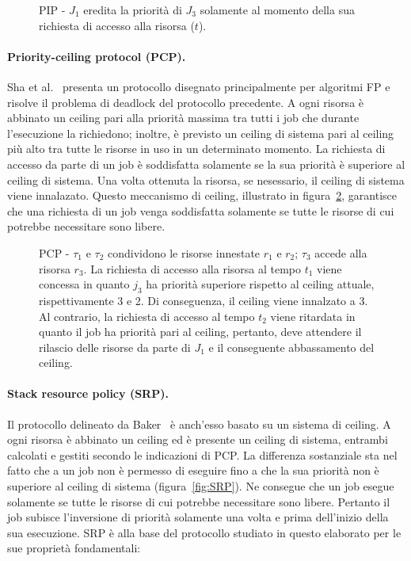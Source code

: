\begin{figure}
\centering
\PIP
\caption{PIP - $J_1$ eredita la priorità di $J_3$ solamente al momento della sua richiesta di accesso alla risorsa ($t$).}
\label{fig:PIP}
\end{figure}

\paragraph{Priority-ceiling protocol (PCP).} Sha et al.~\cite{Sha:1990:PIP:102822.626613} presenta un protocollo disegnato principalmente per algoritmi FP e risolve il problema di deadlock del protocollo precedente. A ogni risorsa è abbinato un ceiling pari alla priorità massima tra tutti i job che durante l'esecuzione la richiedono; inoltre, è previsto un ceiling di sistema pari al ceiling più alto tra tutte le risorse in uso in un determinato momento. La richiesta di accesso da parte di un job è soddisfatta solamente se la sua priorità è superiore al ceiling di sistema. Una volta ottenuta la risorsa, se nesessario, il ceiling di sistema viene innalazato. Questo meccanismo di ceiling, illustrato in figura~\ref{fig:PCP}, garantisce che una richiesta di un job venga soddisfatta solamente se tutte le risorse di cui potrebbe necessitare sono libere.

\begin{figure}
\centering
\PCP
\caption{PCP - $\tau_1$ e $\tau_2$ condividono le risorse innestate $r_1$ e $r_2$; $\tau_3$ accede alla risorsa $r_3$. La richiesta di accesso alla risorsa al tempo $t_1$ viene concessa in quanto $j_3$ ha priorità superiore rispetto al ceiling attuale, rispettivamente 3 e 2. Di conseguenza, il ceiling viene innalzato a 3. Al contrario, la richiesta di accesso al tempo $t_2$ viene ritardata in quanto il job ha priorità pari al ceiling, pertanto, deve attendere il rilascio delle risorse da parte di $J_1$ e il conseguente abbassamento del ceiling.}
\label{fig:PCP}
\end{figure}

\paragraph{Stack resource policy (SRP).} Il protocollo delineato da Baker~\cite{Baker:1991:SSR:113595.113601} è anch'esso basato su un sistema di ceiling. A ogni risorsa è abbinato un ceiling ed è presente un ceiling di sistema, entrambi calcolati e gestiti secondo le indicazioni di PCP. La differenza sostanziale sta nel fatto che a un job non è permesso di eseguire fino a che la sua priorità non è superiore al ceiling di sistema (figura~\ref{fig:SRP}). Ne consegue che un job esegue solamente se tutte le risorse di cui potrebbe necessitare sono libere. Pertanto il job subisce l'inversione di priorità solamente una volta e prima dell'inizio della sua esecuzione. SRP è alla base del protocollo studiato in questo elaborato per le sue proprietà fondamentali:

